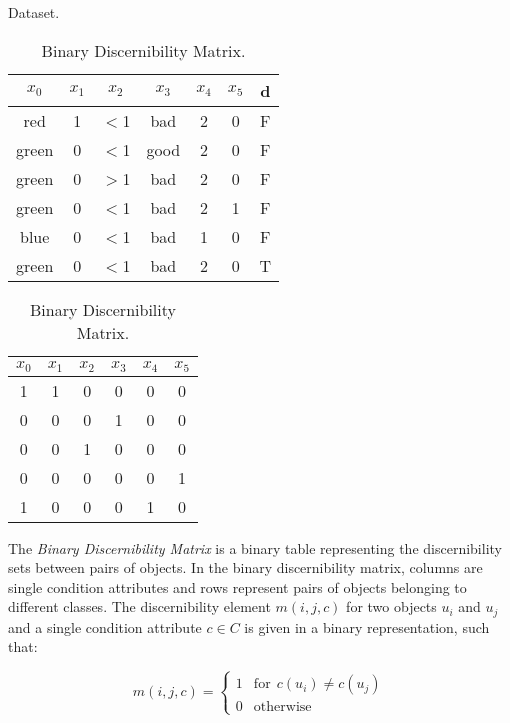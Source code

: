 \documentclass[citenumber]{elsarticle}
\begin{document}
	\begin{table}[htb]
		\begin{minipage}{.4\linewidth}
			\caption{Dataset.} \label{tab:dataset}
			\centering
		 	\begin{tabular}{cccccc|c}
		 		$x_0$ & $x_1$ & $x_2$ & $x_3$ & $x_4$ & $x_5$ & d \\
		 		\hline
				red   & 1 & $<$1 & bad  & 2 & 0 & F \\
				green & 0 & $<$1 & good & 2 & 0 & F \\
				green & 0 & $>$1 & bad  & 2 & 0 & F \\
				green & 0 & $<$1 & bad  & 2 & 1 & F \\
				blue  & 0 & $<$1 & bad  & 1 & 0 & F \\
				green & 0 & $<$1 & bad  & 2 & 0 & T
		 	\end{tabular}       
		\end{minipage}  
		\begin{minipage}{.59\linewidth}
			\caption{Binary Discernibility Matrix.} \label{tab:SBDM}
			\centering
			\begin{tabular}{cccccc}
				$x_0$ & $x_1$ & $x_2$ & $x_3$ & $x_4$ & $x_5$ \\
				\hline
				1 & 1 & 0 & 0 & 0 & 0 \\
				0 & 0 & 0 & 1 & 0 & 0 \\
				0 & 0 & 1 & 0 & 0 & 0 \\
				0 & 0 & 0 & 0 & 0 & 1 \\
				1 & 0 & 0 & 0 & 1 & 0
			\end{tabular}       
			\bigskip
		\end{minipage}    
 	\end{table}
 
 The \textit{Binary Discernibility Matrix} is a binary table representing the discernibility sets between pairs of objects. In the binary discernibility matrix, columns are single condition attributes and rows represent pairs of objects belonging to different classes. The discernibility element $m(i, j, c)$ for two objects $u_i$ and $u_j$ and a single condition attribute $c \in C$ is given in a binary representation, such that:
 
 \begin{equation}
 m(i, j, c)=\left\lbrace\begin{array}{cl}
 1 & \mathrm{for~~}c(u_i) \neq c(u_j)\\
 0 & \mathrm{otherwise} 
 \end{array}\right.
 \end{equation} 
 
\end{document}
